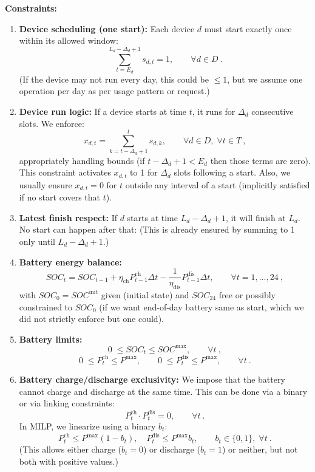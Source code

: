 \documentclass[12pt,a4paper]{article}
\begin{document}
\textbf{Constraints:}
\begin{enumerate}[label=(\arabic*)]
    \item \textbf{Device scheduling (one start):} Each device $d$ must start exactly once within its allowed window:
    \[
    \sum_{t = E_d}^{L_d - \Delta_d + 1} s_{d,t} = 1, \qquad \forall d \in D~.
    \]
    (If the device may not run every day, this could be $\le 1$, but we assume one operation per day as per usage pattern or request.)
    \item \textbf{Device run logic:} If a device starts at time $t$, it runs for $\Delta_d$ consecutive slots. We enforce:
    \[
    x_{d,t} = \sum_{k = t-\Delta_d+1}^{t} s_{d,k}, \qquad \forall d \in D, \; \forall t \in T~,
    \]
    appropriately handling bounds (if $t-\Delta_d+1 < E_d$ then those terms are zero). This constraint activates $x_{d,t}$ to 1 for $\Delta_d$ slots following a start.
    Also, we usually ensure $x_{d,t} = 0$ for $t$ outside any interval of a start (implicitly satisfied if no start covers that $t$).
    \item \textbf{Latest finish respect:} If $d$ starts at time $L_d - \Delta_d + 1$, it will finish at $L_d$. No start can happen after that:
    (This is already ensured by summing to 1 only until $L_d - \Delta_d + 1$.)
    \item \textbf{Battery energy balance:} 
    \[
    SOC_{t} = SOC_{t-1} + \eta_{\text{ch}} P^{\text{ch}}_{t-1}\Delta t - \frac{1}{\eta_{\text{dis}}} P^{\text{dis}}_{t-1}\Delta t, \qquad \forall t = 1,\dots,24~,
    \]
    with $SOC_0 = SOC^{\text{init}}$ given (initial state) and $SOC_{24}$ free or possibly constrained to $SOC_0$ (if we want end-of-day battery same as start, which we did not strictly enforce but one could).
    \item \textbf{Battery limits:} 
    \[
    0 \;\le SOC_t \le SOC^{\text{max}}, \qquad \forall t~,
    \]
    \[
    0 \;\le P^{\text{ch}}_t \le P^{\max}, \qquad 
    0 \;\le P^{\text{dis}}_t \le P^{\max}, \qquad \forall t~.
    \]
    \item \textbf{Battery charge/discharge exclusivity:} 
    We impose that the battery cannot charge and discharge at the same time. This can be done via a binary or via linking constraints:
    \[
    P^{\text{ch}}_t \cdot P^{\text{dis}}_t = 0, \qquad \forall t~.
    \]
    In MILP, we linearize using a binary $b_t$:
    \[
    P^{\text{ch}}_t \le P^{\max} (1 - b_t), \quad 
    P^{\text{dis}}_t \le P^{\max} b_t, \qquad b_t \in \{0,1\}, \; \forall t~.
    \]
    (This allows either charge ($b_t=0$) or discharge ($b_t=1$) or neither, but not both with positive values.)

\end{enumerate}
\end{document}
